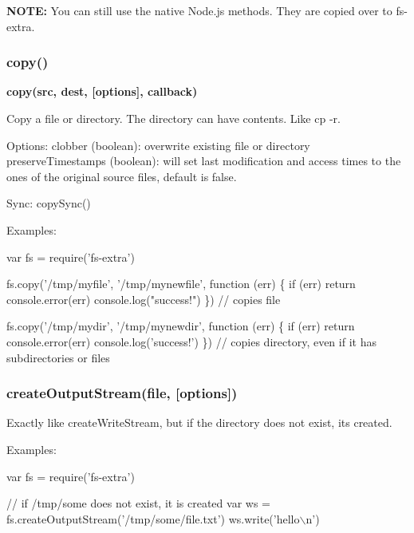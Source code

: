 {\bfseries N\+O\+T\+E\+:} You can still use the native Node.\+js methods. They are copied over to {\ttfamily fs-\/extra}.

\subsubsection*{copy()}

{\bfseries copy(src, dest, \mbox{[}options\mbox{]}, callback)}

Copy a file or directory. The directory can have contents. Like {\ttfamily cp -\/r}.

Options\+: clobber (boolean)\+: overwrite existing file or directory preserve\+Timestamps (boolean)\+: will set last modification and access times to the ones of the original source files, default is {\ttfamily false}.

Sync\+: {\ttfamily copy\+Sync()}

Examples\+:


\begin{DoxyCode}
var fs = require(\textcolor{stringliteral}{'fs-extra'})

fs.copy('/tmp/myfile', '/tmp/mynewfile', function (err) \{
  \textcolor{keywordflow}{if} (err) \textcolor{keywordflow}{return} console.error(err)
  console.log(\textcolor{stringliteral}{"success!"})
\}) \textcolor{comment}{// copies file}

fs.copy(\textcolor{stringliteral}{'/tmp/mydir'}, \textcolor{stringliteral}{'/tmp/mynewdir'}, function (err) \{
  \textcolor{keywordflow}{if} (err) \textcolor{keywordflow}{return} console.error(err)
  console.log(\textcolor{stringliteral}{'success!'})
\}) \textcolor{comment}{// copies directory, even if it has subdirectories or files}
\end{DoxyCode}


\subsubsection*{create\+Output\+Stream(file, \mbox{[}options\mbox{]})}

Exactly like {\ttfamily create\+Write\+Stream}, but if the directory does not exist, it\textquotesingle{}s created.

Examples\+:


\begin{DoxyCode}
var fs = require(\textcolor{stringliteral}{'fs-extra'})

\textcolor{comment}{// if /tmp/some does not exist, it is created}
var ws = fs.createOutputStream('/tmp/some/file.txt')
ws.write('hello\(\backslash\)n')
\end{DoxyCode}


